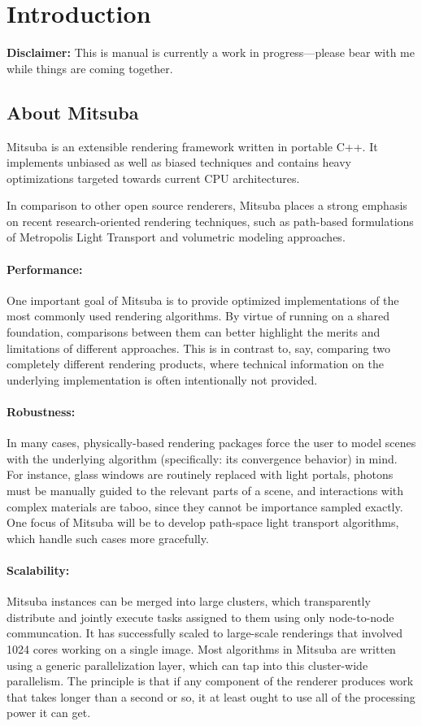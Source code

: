 \section{Introduction}
\textbf{Disclaimer:} This is manual is currently a work in progress---please
bear with me while things are coming together.

\subsection{About Mitsuba}
Mitsuba is an extensible rendering framework written in portable C++. It implements unbiased 
as well as biased techniques and contains heavy optimizations targeted towards current CPU 
architectures.

In comparison to other open source renderers, Mitsuba places a strong emphasis on recent research-oriented 
rendering techniques, such as path-based formulations of Metropolis Light Transport and volumetric
modeling approaches.

\paragraph{Performance:}
One important goal of Mitsuba is to provide optimized implementations of the most commonly 
used rendering algorithms. By virtue of running on a shared foundation, comparisons between them can
better highlight the merits and limitations of different approaches. This is in contrast to, say, 
comparing two completely different rendering products, where technical information on the underlying 
implementation is often intentionally not provided.

\paragraph{Robustness:}
In many cases, physically-based rendering packages force the user to model scenes with the underlying 
algorithm (specifically: its convergence behavior) in mind. For instance, glass windows are routinely 
replaced with light portals, photons must be manually guided to the relevant parts of a scene, and 
interactions with complex materials are taboo, since they cannot be importance sampled exactly. 
One focus of Mitsuba will be to develop path-space light transport algorithms, which handle such 
cases more gracefully.

\paragraph{Scalability:} Mitsuba instances can be merged into large clusters, which transparently distribute and 
jointly execute tasks assigned to them using only node-to-node communcation. It has successfully
scaled to large-scale renderings that involved 1024 cores working on a single image.
Most algorithms in Mitsuba  are written using a generic parallelization layer, which can tap 
into this cluster-wide parallelism. The principle is that if any component of the renderer produces
work that takes longer than a second or so, it at least ought to use all of the processing power 
it can get.

